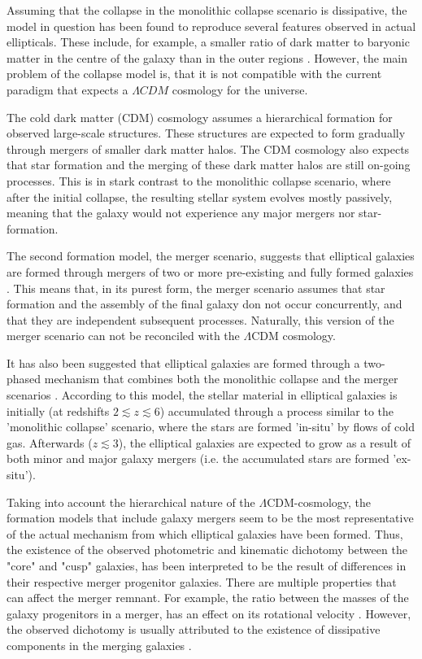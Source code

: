 \documentclass[english, twoside]{HYgradu}
\begin{document}
Assuming that the collapse in the monolithic collapse scenario is dissipative, the model in question has been found to reproduce several features observed in actual ellipticals. These include, for example, a smaller ratio of dark matter to baryonic matter in the centre of the galaxy than in the outer regions \citep{GalaxyFormationAndEvo2010}. However, the main problem of the collapse model is, that it is not compatible with the current paradigm that expects a $\Lambda CDM$ cosmology for the universe. 

The cold dark matter (CDM) cosmology assumes a hierarchical formation for observed large-scale structures. These structures are expected to form gradually through mergers of smaller dark matter halos. The CDM cosmology also expects that star formation and the merging of these dark matter halos are still on-going processes. This is in stark contrast to the monolithic collapse scenario, where after the initial collapse, the resulting stellar system evolves mostly passively, meaning that the galaxy would not experience any major mergers nor star-formation.

The second formation model, the merger scenario, suggests that elliptical galaxies are formed through mergers of two or more pre-existing and fully formed galaxies \citep{GalaxyFormationAndEvo2010}. This means that, in its purest form, the merger scenario assumes that star formation and the assembly of the final galaxy don not occur concurrently, and that they are independent subsequent processes. Naturally, this version of the merger scenario can not be reconciled with the $\Lambda \mathrm{CDM}$ cosmology.

It has also been suggested that elliptical galaxies are formed through a two-phased mechanism that combines both the monolithic collapse and the merger scenarios \citep[e.g.][]{Oser2010}. According to this model, the stellar material in elliptical galaxies is initially (at redshifts $2 \lesssim z \lesssim 6$) accumulated through a process similar to the 'monolithic collapse' scenario, where the stars are formed 'in-situ' by flows of cold gas. Afterwards ($z \lesssim 3$), the elliptical galaxies are expected to grow as a result of both minor and major galaxy mergers (i.e. the accumulated stars are formed 'ex-situ'). 

Taking into account the hierarchical nature of the $\Lambda \mathrm{CDM}$-cosmology, the formation models that include galaxy mergers seem to be the most representative of the actual mechanism from which elliptical galaxies have been formed. Thus, the existence of the observed photometric and kinematic dichotomy between the "core" and "cusp" galaxies, has been interpreted to be the result of differences in their respective merger progenitor galaxies. There are multiple properties that can affect the merger remnant. For example, the ratio between the masses of the galaxy progenitors in a merger, has an effect on its rotational velocity \citep{Naab2003}. However, the observed dichotomy is usually attributed to the existence of dissipative components in the merging galaxies \citep{GalaxyFormationAndEvo2010}.
\end{document}
